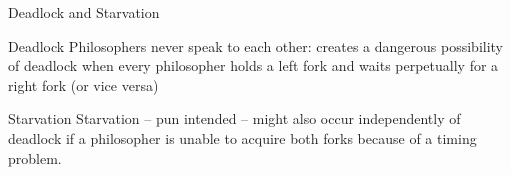 \begin{frame}{Deadlock and Starvation}
  \begin{block}{Deadlock}
    Philosophers never speak to each other: creates a dangerous
    possibility of deadlock when every philosopher holds a left fork
    and waits perpetually for a right fork (or vice versa)
  \end{block}


  \begin{block}{Starvation}
    Starvation -- pun intended -- might also occur independently of
    deadlock if a philosopher is unable to acquire both forks because
    of a timing problem.
  \end{block}
\end{frame}

